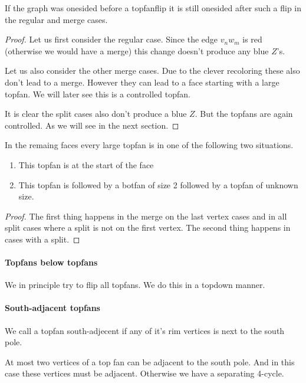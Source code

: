 \begin{lemma}
  \label{lm:}
  If the graph was onesided before a topfanflip it is still onesided after such a flip in the regular and merge cases.
\end{lemma}
\begin{proof}
  Let us first consider the regular case. Since the edge  $v_n w_m$ is red (otherwise we would have a merge) this change doesn't produce any blue $Z$'s.

  Let us also consider the other merge cases. Due to the   clever recoloring these also don't lead to a merge. However they can lead to a face starting with a large topfan. We will later see this is a controlled topfan.

  It is clear the split cases also don't produce a blue $Z$. But the topfans are again controlled. As we will see in the next section.
\end{proof}


\begin{lemma}
  \label{lm:}
  In the remaing faces every large topfan is in one of the following two situations.
  \begin{enumerate}
    \item  This topfan is at the start of the face
    \item  This topfan is followed by a botfan of size 2 followed by a topfan of unknown size.
  \end{enumerate}
\end{lemma}
\begin{proof}
  The first thing happens in the merge on the last vertex cases and in all split cases where a split is not on the first vertex. The second thing happens in cases with a split.
\end{proof}


\paragraph{Topfans below topfans}
We in principle try to flip all topfans. We do this in a topdown manner.


\paragraph{South-adjacent topfans}
We call a topfan south-adjecent if any of it's rim vertices is next to the south pole.

At most two vertices of a top fan can be adjacent to the south pole. And in this case these vertices must be adjacent. Otherwise we have a separating 4-cycle.

